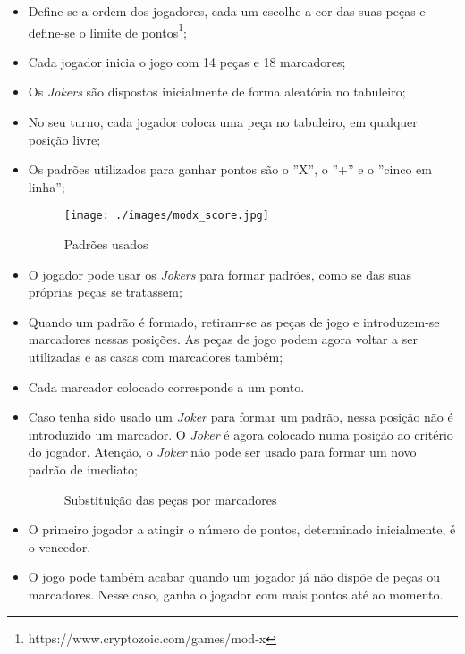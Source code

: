 \documentclass[a4paper]{article}
\begin{document}
\begin{itemize}
	\item Define-se a ordem dos jogadores, cada um escolhe a cor das suas peças e define-se o limite de pontos\footnote{https://www.cryptozoic.com/games/mod-x};
	\item Cada jogador inicia o jogo com 14 peças e 18 marcadores;
	\item Os \textit{Jokers} são dispostos inicialmente de forma aleatória no tabuleiro; 
	\item No seu turno, cada jogador coloca uma peça no tabuleiro, em qualquer posição livre;
	\item Os padrões utilizados para ganhar pontos são o ''X'', o ''+'' e o ''cinco em linha'';
	
	\begin{figure}[h!]
		\begin{center}
			\texttt{[image: ./images/modx\_score.jpg]}
			\caption{Padrões usados}
			\label{fig:2}
		\end{center}
	\end{figure}
	
	\item O jogador pode usar os \textit{Jokers} para formar padrões, como se das suas próprias peças se tratassem;
	\item Quando um padrão é formado, retiram-se as peças de jogo e introduzem-se marcadores nessas posições. As peças de jogo podem agora voltar a ser utilizadas e as casas com marcadores também;
	\item Cada marcador colocado corresponde a um ponto.
	\item Caso tenha sido usado um \textit{Joker} para formar um padrão, nessa posição não é introduzido um marcador. O \textit{Joker} é agora colocado numa posição ao critério do jogador. Atenção, o \textit{Joker} não pode ser usado para formar um novo padrão de imediato; 
	
	\begin{figure}[!h]
		\centering
		\hfill
		\caption{Substituição das peças por marcadores}
	\end{figure}
	
	\item O primeiro jogador a atingir o número de pontos, determinado inicialmente, é o vencedor.
	\item O jogo pode também acabar quando um jogador já não dispõe de peças ou marcadores. Nesse caso, ganha o jogador com mais pontos até ao momento. 
	

	
\end{itemize}
\end{document}
